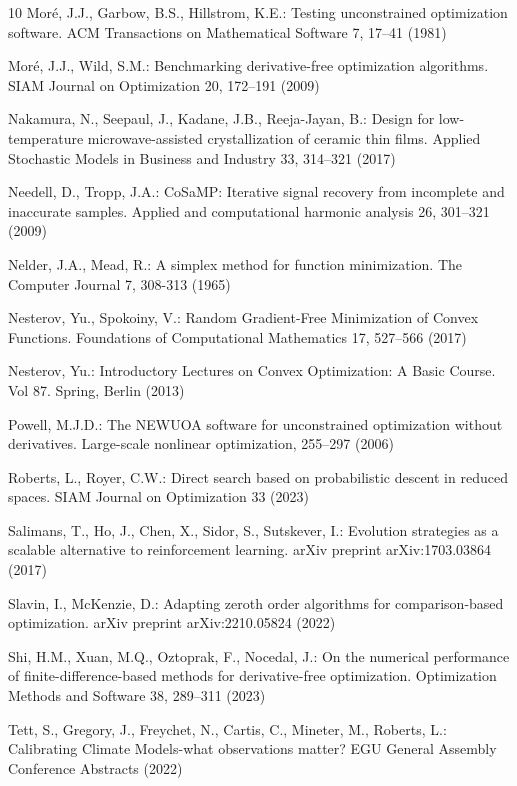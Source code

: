 \begin{thebibliography}{10}
 Mor\'e, J.J., Garbow, B.S., Hillstrom, K.E.: Testing unconstrained optimization software. ACM Transactions on Mathematical Software 7, 17--41 (1981)

 Mor{\'e}, J.J., Wild, S.M.: Benchmarking derivative-free optimization algorithms. SIAM Journal on Optimization 20, 172--191 (2009)

 Nakamura, N., Seepaul, J., Kadane, J.B., Reeja-Jayan, B.: Design for low-temperature microwave-assisted crystallization of ceramic thin films. Applied Stochastic Models in Business and Industry 33, 314--321 (2017)

 Needell, D., Tropp, J.A.: CoSaMP: Iterative signal recovery from incomplete and inaccurate samples. Applied and computational harmonic analysis 26, 301--321 (2009)

 Nelder, J.A., Mead, R.: A simplex method for function minimization. The Computer Journal 7, 308-313 (1965)

Nesterov, Yu., Spokoiny, V.: Random Gradient-Free Minimization of Convex Functions. Foundations of Computational Mathematics 17, 527--566 (2017)

Nesterov, Yu.: Introductory Lectures on Convex Optimization: A Basic Course. Vol 87. Spring, Berlin (2013)

 Powell, M.J.D.: The NEWUOA software for unconstrained optimization without derivatives. Large-scale nonlinear optimization, 255--297 (2006)

Roberts, L., Royer, C.W.: Direct search based on probabilistic descent in reduced spaces. SIAM Journal on Optimization 33 (2023)

 Salimans, T., Ho, J., Chen, X., Sidor, S., Sutskever, I.: Evolution strategies as a scalable alternative to reinforcement learning. arXiv preprint arXiv:1703.03864 (2017)

 Slavin, I., McKenzie, D.: Adapting zeroth order algorithms for comparison-based optimization. arXiv preprint arXiv:2210.05824 (2022)

 Shi, H.M., Xuan, M.Q., Oztoprak, F., Nocedal, J.: On the numerical performance of finite-difference-based methods for derivative-free optimization. Optimization Methods and Software 38, 289--311 (2023)

 Tett, S., Gregory, J., Freychet, N., Cartis, C., Mineter, M., Roberts, L.: Calibrating Climate Models-what observations matter? EGU General Assembly Conference Abstracts (2022)


\end{thebibliography}
